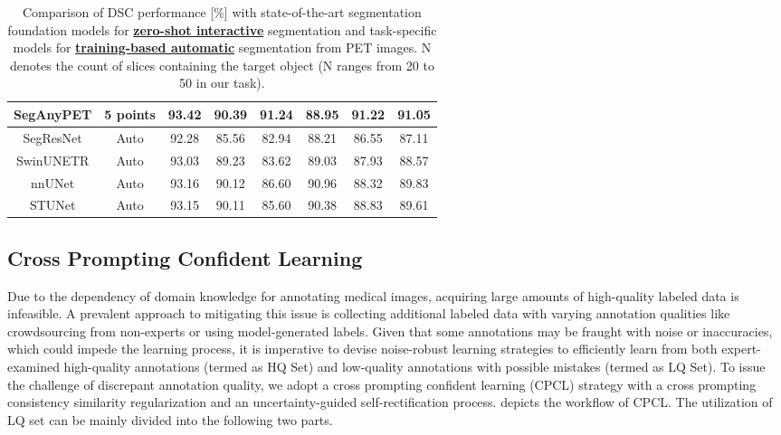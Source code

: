 \begin{table*}[t]
\begin{tabular}{c|c|ccccc|c}
\rowcolor{gray!25} \textbf{SegAnyPET}  & 5 points & 93.42 & 90.39 & 91.24 & 88.95 & 91.22 & 91.05 \\ \hline \hline
SegResNet \cite{segresnet} & Auto & 92.28 & 85.56 & 82.94 & 88.21 & 86.55 & 87.11 \\
SwinUNETR \cite{hatamizadeh2021swin} & Auto & 93.03 & 89.23 & 83.62 & 89.03 & 87.93 & 88.57 \\
nnUNet \cite{isensee2020nnunet}  & Auto & 93.16 & 90.12 & 86.60 & 90.96 & 88.32 & 89.83 \\
STUNet \cite{huang2023stunet} & Auto & 93.15 & 90.11 & 85.60 & 90.38 & 88.83 & 89.61 \\
\hline  \hline
	\end{tabular}
 	\caption{Comparison of DSC performance [\%] with state-of-the-art segmentation foundation models for \textbf{\underline{zero-shot interactive}} segmentation  and task-specific models for \textbf{\underline{training-based automatic}} segmentation from PET images. N denotes the count of slices containing the target object (N ranges from 20 to 50 in our task).} \label{Table_Seen}
\end{table*}



\subsection{Cross Prompting Confident Learning}

Due to the dependency of domain knowledge for annotating medical images, acquiring large amounts of high-quality labeled data is infeasible.
A prevalent approach to mitigating this issue is collecting additional labeled data with varying annotation qualities like crowdsourcing from non-experts or using model-generated labels.
Given that some annotations may be fraught with noise or inaccuracies, which could impede the learning process, it is imperative to devise noise-robust learning strategies to efficiently learn from both expert-examined high-quality annotations (termed as HQ Set) and low-quality annotations with possible mistakes (termed as LQ Set).
To issue the challenge of discrepant annotation quality, we adopt a cross prompting confident learning (CPCL) strategy with a cross prompting consistency similarity regularization and an uncertainty-guided self-rectification process.
 depicts the workflow of CPCL. The utilization of LQ set can be mainly divided into the following two parts.

